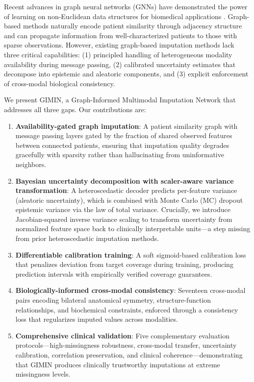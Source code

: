 \documentclass[journal,twoside,web]{ieeecolor}
\begin{document}
Recent advances in graph neural networks (GNNs) have demonstrated the power of learning on non-Euclidean data structures for biomedical applications \cite{zhou2020graph, parisot2018disease}. Graph-based methods naturally encode patient similarity through adjacency structure and can propagate information from well-characterized patients to those with sparse observations. However, existing graph-based imputation methods lack three critical capabilities: (1) principled handling of heterogeneous modality availability during message passing, (2) calibrated uncertainty estimates that decompose into epistemic and aleatoric components, and (3) explicit enforcement of cross-modal biological consistency.

We present GIMIN, a Graph-Informed Multimodal Imputation Network that addresses all three gaps. Our contributions are:

\begin{enumerate}
    \item \textbf{Availability-gated graph imputation}: A patient similarity graph with message passing layers gated by the fraction of shared observed features between connected patients, ensuring that imputation quality degrades gracefully with sparsity rather than hallucinating from uninformative neighbors.

    \item \textbf{Bayesian uncertainty decomposition with scaler-aware variance transformation}: A heteroscedastic decoder predicts per-feature variance (aleatoric uncertainty), which is combined with Monte Carlo (MC) dropout epistemic variance via the law of total variance. Crucially, we introduce Jacobian-squared inverse variance scaling to transform uncertainty from normalized feature space back to clinically interpretable units---a step missing from prior heteroscedastic imputation methods.

    \item \textbf{Differentiable calibration training}: A soft sigmoid-based calibration loss that penalizes deviation from target coverage during training, producing prediction intervals with empirically verified coverage guarantees.

    \item \textbf{Biologically-informed cross-modal consistency}: Seventeen cross-modal pairs encoding bilateral anatomical symmetry, structure-function relationships, and biochemical constraints, enforced through a consistency loss that regularizes imputed values across modalities.

    \item \textbf{Comprehensive clinical validation}: Five complementary evaluation protocols---high-missingness robustness, cross-modal transfer, uncertainty calibration, correlation preservation, and clinical coherence---demonstrating that GIMIN produces clinically trustworthy imputations at extreme missingness levels.
\end{enumerate}
\end{document}
